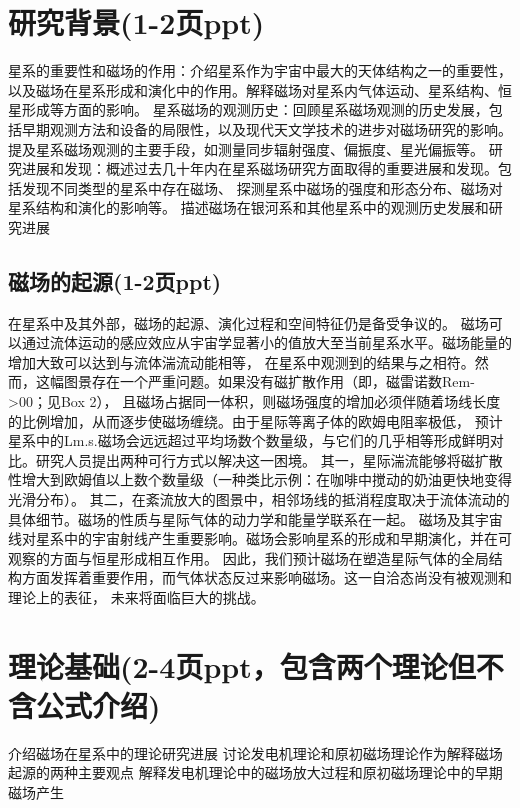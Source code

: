 \documentclass[12pt, a4paper, oneside]{ctexart}
\title{}
\date{\today}
\author{202011010101物理2001孙陶庵}
\begin{document}
\begin{spacing}{2.0}
\tableofcontents
\maketitle
\section{研究背景(1-2页ppt)}
星系的重要性和磁场的作用：介绍星系作为宇宙中最大的天体结构之一的重要性，
以及磁场在星系形成和演化中的作用。解释磁场对星系内气体运动、星系结构、恒星形成等方面的影响。
星系磁场的观测历史：回顾星系磁场观测的历史发展，包括早期观测方法和设备的局限性，以及现代天文学技术的进步对磁场研究的影响。
提及星系磁场观测的主要手段，如测量同步辐射强度、偏振度、星光偏振等。
研究进展和发现：概述过去几十年内在星系磁场研究方面取得的重要进展和发现。包括发现不同类型的星系中存在磁场、
探测星系中磁场的强度和形态分布、磁场对星系结构和演化的影响等。
描述磁场在银河系和其他星系中的观测历史发展和研究进展
\subsection{磁场的起源(1-2页ppt)}
在星系中及其外部，磁场的起源、演化过程和空间特征仍是备受争议的。
磁场可以通过流体运动的感应效应从宇宙学显著小的值放大至当前星系水平。磁场能量的增加大致可以达到与流体湍流动能相等，
在星系中观测到的结果与之相符。然而，这幅图景存在一个严重问题。如果没有磁扩散作用（即，磁雷诺数Rem->00；见Box 2），
且磁场占据同一体积，则磁场强度的增加必须伴随着场线长度的比例增加，从而逐步使磁场缠绕。由于星际等离子体的欧姆电阻率极低，
预计星系中的Lm.s.磁场会远远超过平均场数个数量级，与它们的几乎相等形成鲜明对比。研究人员提出两种可行方式以解决这一困境。
其一，星际湍流能够将磁扩散性增大到欧姆值以上数个数量级（一种类比示例：在咖啡中搅动的奶油更快地变得光滑分布）。
其二，在紊流放大的图景中，相邻场线的抵消程度取决于流体流动的具体细节。磁场的性质与星际气体的动力学和能量学联系在一起。
磁场及其宇宙线对星系中的宇宙射线产生重要影响。磁场会影响星系的形成和早期演化，并在可观察的方面与恒星形成相互作用。
因此，我们预计磁场在塑造星际气体的全局结构方面发挥着重要作用，而气体状态反过来影响磁场。这一自洽态尚没有被观测和理论上的表征，
未来将面临巨大的挑战。

\section{理论基础(2-4页ppt，包含两个理论但不含公式介绍)}
介绍磁场在星系中的理论研究进展
讨论发电机理论和原初磁场理论作为解释磁场起源的两种主要观点
解释发电机理论中的磁场放大过程和原初磁场理论中的早期磁场产生

\end{spacing}
\end{document}
